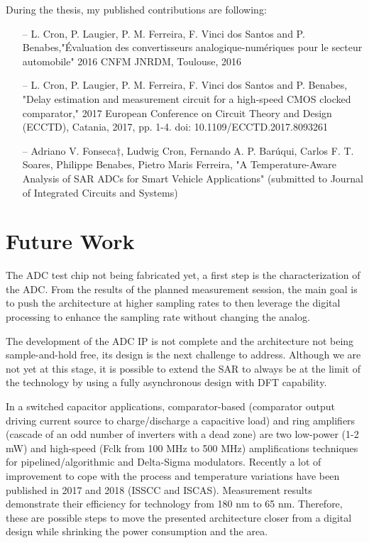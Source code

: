 During the thesis, my published contributions are following:
\begin{itemize}
    \item[--] L. Cron, P. Laugier, P. M. Ferreira, F. Vinci dos Santos and P. Benabes,"Évaluation des convertisseurs analogique-numériques pour le secteur automobile" 2016 CNFM JNRDM, Toulouse, 2016
    \item[--] L. Cron, P. Laugier, P. M. Ferreira, F. Vinci dos Santos and P. Benabes, "Delay estimation and measurement circuit for a high-speed CMOS clocked comparator," 2017 European Conference on Circuit Theory and Design (ECCTD), Catania, 2017, pp. 1-4. doi: 10.1109/ECCTD.2017.8093261
    \item[--] Adriano V. Fonseca†, Ludwig Cron, Fernando A. P. Barúqui,
    Carlos F. T. Soares, Philippe Benabes, Pietro Maris Ferreira, "A Temperature-Aware Analysis of SAR ADCs for Smart Vehicle Applications" (submitted to Journal of Integrated Circuits and Systems)
\end{itemize}

\clearpage
\section{Future Work}          %
The ADC test chip not being fabricated yet, a first step is the characterization of the ADC\@. From the results of the planned measurement session, the main goal is to push the architecture at higher sampling rates to then leverage the digital processing to enhance the sampling rate without changing the analog.

The development of the ADC IP is not complete and the architecture not being sample-and-hold free, its design is the next challenge to address. Although we are not yet at this stage, it is possible to extend the SAR to always be at the limit of the technology by using a fully asynchronous design with DFT capability.

In a switched capacitor applications, comparator-based (comparator output driving current source to charge/discharge a capacitive load) and ring amplifiers (cascade of an odd number of inverters with a dead zone) are two low-power (1-2 mW) and high-speed (Fclk from 100 MHz to 500 MHz) amplifications techniques for pipelined/algorithmic and Delta-Sigma modulators. Recently a lot of improvement to cope with the process and temperature variations have been published in 2017 and 2018 (ISSCC and ISCAS). Measurement results demonstrate their efficiency for technology from 180 nm to 65 nm. Therefore, these are possible steps to move the presented architecture closer from a digital design while shrinking the power consumption and the area.

